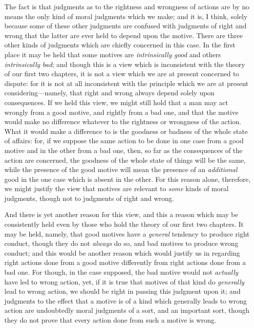 The fact is that judgments as to the rightness and wrongness of
actions are by no means the only kind of moral judgments which we
make; and it is, I think, solely because some of these other judgments
are confused with judgments of right and wrong that the latter are
ever held to depend upon the motive. There are three other kinds of
judgments which are chiefly concerned in this case. In the first place
it may be held that some motives are \textit{intrinsically good} and
others \textit{intrinsically bad}; and though this is a view which is
inconsistent with the theory of our first two chapters, it is not a
view which we are at present concerned to dispute: for it is not at
all inconsistent with the principle which we are at present
considering---namely, that right and wrong always depend solely upon
consequences. If we held this view, we might still hold that a
 man may act wrongly from a good motive, and rightly from a
bad one, and that the motive would make no difference whatever to the
rightness or wrongness of the action. What it would make a difference
to is the goodness or badness of the whole state of affairs: for, if
we suppose the same action to be done in one case from a good motive
and in the other from a bad one, then, so far as the consequences of
the action are concerned, the goodness of the whole state of things
will be the same, while the presence of the good motive will mean the
presence of an \textit{additional} good in the one case which is
absent in the other. For this reason alone, therefore, we might
justify the view that motives are relevant to \textit{some} kinds of
moral judgments, though not to judgments of right and wrong.

And there is yet another reason for this view, and this a reason which
may be consistently held even by those who hold the theory of our
first two chapters. It may be held, namely, that good motives have a
\textit{general} tendency to produce right conduct, though they do not
\textit{always} do so, and bad motives to produce wrong conduct; and
this would be another  reason which would justify us in
regarding right actions done from a good motive differently from right
actions done from a bad one. For though, in the case supposed, the bad
motive would not \textit{actually} have led to wrong action, yet, if
it is true that motives of that kind do \textit{generally} lead to
wrong action, we should be right in passing this judgment upon it; and
judgments to the effect that a motive is of a kind which generally
leads to wrong action are undoubtedly moral judgments of a sort, and
an important sort, though they do not prove that every action done
from such a motive is wrong.

